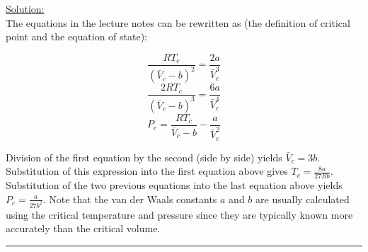 \noindent
\underline{Solution:}\\

The equations in the lecture notes can be rewritten as (the definition of critical point and the equation of state):

$$\frac{RT_c}{\left(\bar{V}_c - b\right)^2} = \frac{2a}{\bar{V}_c^3}$$
$$\frac{2RT_c}{\left(\bar{V}_c - b\right)^3} = \frac{6a}{\bar{V}_c^4}$$
$$P_c = \frac{RT_c}{\bar{V}_c - b} - \frac{a}{\bar{V}_c^2}$$

Division of the first equation by the second (side by side) yields $\bar{V}_c = 3b$. Substitution of this expression into the first equation above gives $T_c = \frac{8a}{27Rb}$. Substitution of the two previous equations into the last equation above yields $P_c = 
\frac{a}{27b^2}$. Note that the van der Waals constants $a$ and $b$ are usually calculated using the critical temperature and pressure since they are typically known more accurately than the critical volume.

\hrule\vspace{0.5cm}
